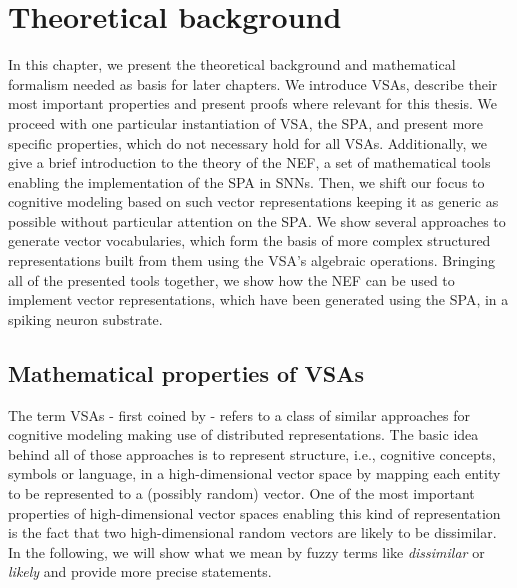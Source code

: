 \chapter{Theoretical background}%
\label{chap:introduction_to_vsas}

In this chapter, we present the theoretical background and mathematical formalism needed as basis for later chapters.
We introduce \acfp{VSA}, describe their most important properties and present proofs where relevant for this thesis.
We proceed with one particular instantiation of \ac{VSA}, the \acf{SPA}, and present more specific properties, which do not necessary hold for all \acp{VSA}.
Additionally, we give a brief introduction to the theory of the \acf{NEF}, a set of mathematical tools enabling the implementation of the \ac{SPA} in \acp{SNN}.
Then, we shift our focus to cognitive modeling based on such vector representations keeping it as generic as possible without particular attention on the \ac{SPA}. 
We show several approaches to generate vector vocabularies, which form the basis of more complex structured representations built from them using the \ac{VSA}'s algebraic operations.
Bringing all of the presented tools together, we show how the \ac{NEF} can be used to implement vector representations, which have been generated using the \ac{SPA}, in a spiking neuron substrate.

\section{Mathematical properties of \aclp{VSA}}
\label{sec:math_prop_vsas}

The term \acp{VSA} - first coined by \textcite{Gayler2003} - refers to a class of similar approaches for cognitive modeling making use of distributed representations.
The basic idea behind all of those approaches is to represent structure, i.e., cognitive concepts, symbols or language, in a high-dimensional vector space by mapping each entity to be represented to a (possibly random) vector.
One of the most important properties of high-dimensional vector spaces enabling this kind of representation is the fact that two high-dimensional random vectors are likely to be dissimilar.
In the following, we will show what we mean by fuzzy terms like \emph{dissimilar} or \emph{likely} and provide more precise statements.

